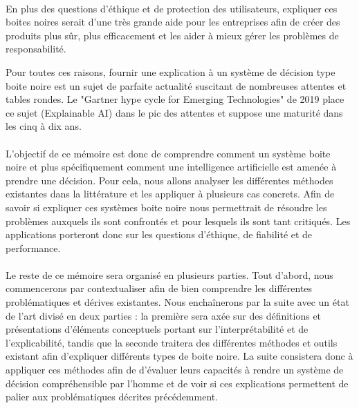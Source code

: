 \paragraph{}En plus des questions d'éthique et de protection des utilisateurs, expliquer ces boites noires serait d'une très grande aide pour les entreprises afin de créer des produits plus sûr, plus efficacement et les aider à mieux gérer les problèmes de responsabilité.\par
Pour toutes ces raisons, fournir une explication à un système de décision type boite noire est un sujet de parfaite actualité suscitant de nombreuses attentes et tables rondes. Le "Gartner hype cycle for Emerging Technologies" de 2019 place ce sujet (Explainable AI) dans le pic des attentes et suppose une maturité dans les cinq à dix ans.

\paragraph{}L’objectif de ce mémoire est donc de comprendre comment un système boite noire et plus spécifiquement comment une intelligence artificielle est amenée à prendre une décision. Pour cela, nous allons analyser les différentes méthodes existantes dans la littérature et les appliquer à plusieurs cas concrets. Afin de savoir si expliquer ces systèmes boite noire nous permettrait de résoudre les problèmes auxquels ils sont confrontés et pour lesquels ils sont tant critiqués. Les applications porteront donc sur les questions d'éthique, de fiabilité et de performance.\\

\paragraph{}Le reste de ce mémoire sera organisé en plusieurs parties. Tout d'abord, nous commencerons par contextualiser afin de bien comprendre les différentes problématiques et dérives existantes. Nous enchaînerons par la suite avec un état de l'art divisé en deux parties : la première sera axée sur des définitions et présentations d'éléments conceptuels portant sur l'interprétabilité et de l'explicabilité, tandis que la seconde traitera des différentes méthodes et outils existant afin d'expliquer différents types de boite noire. La suite consistera donc à appliquer ces méthodes afin de d'évaluer leurs capacités à rendre un système de décision compréhensible par l'homme et de voir si ces explications permettent de palier aux problématiques décrites précédemment.

